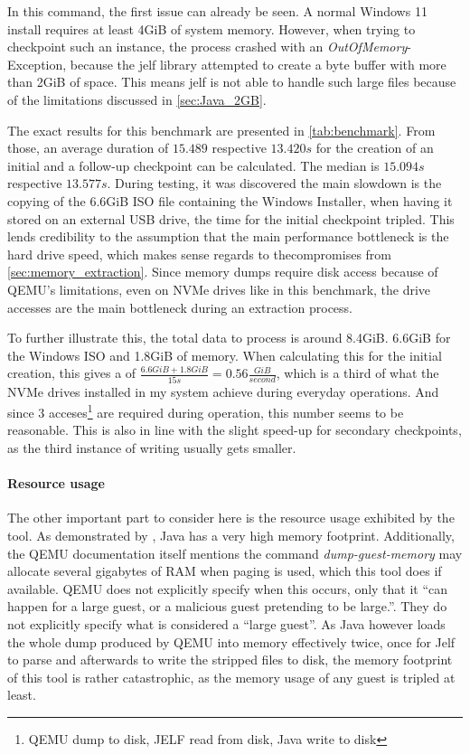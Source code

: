In this command, the first issue can already be seen.
A normal Windows 11 install requires at least 4GiB of system memory.
However, when trying to checkpoint such an instance, the process crashed with an \emph{OutOfMemory}-Exception,
because the jelf library\cite{jelf} attempted to create a byte buffer with more than 2GiB of space.
This means jelf is not able to handle such large files because of the limitations discussed in \autoref{sec:Java_2GB}.

The exact results for this benchmark are presented in \autoref{tab:benchmark}.
From those, an average duration of $15.489$ respective $13.420s$ for the creation of an initial and a follow-up checkpoint can be calculated.
The median is $15.094s$ respective $13.577s$.
During testing, it was discovered the main slowdown is the copying of the 6.6GiB ISO file containing the Windows Installer,
when having it stored on an external USB drive, the time for the initial checkpoint tripled.
This lends credibility to the assumption that the main performance bottleneck is the hard drive speed,
which makes sense regards to thecompromises from \autoref{sec:memory_extraction}.
Since memory dumps require disk access because of QEMU's limitations,
even on NVMe drives like in this benchmark, the drive accesses are the main bottleneck during an extraction process.

To further illustrate this, the total data to process is around 8.4GiB. 6.6GiB for the Windows ISO and 1.8GiB of memory.
When calculating this for the initial creation, this gives a  of $\frac{6.6GiB + 1.8 GiB}{15s}=0.56\frac{GiB}{second}$,
which is a third of what the NVMe drives installed in my system achieve during everyday operations.
And since 3 acceses\footnote{QEMU dump to disk, JELF read from disk, Java write to disk} are required during operation,
this number seems to be reasonable.
This is also in line with the slight speed-up for secondary checkpoints, as the third instance of writing usually gets smaller.

\paragraph{Resource usage} The other important part to consider here is the resource usage exhibited by the tool.
As demonstrated by ,
Java has a very high memory footprint\cite{Java_Performance}.
Additionally, the QEMU documentation itself mentions the command \emph{dump-guest-memory}
may allocate several gigabytes of RAM when paging is used,
which this tool does if available.
QEMU does not explicitly specify when this occurs,
only that it \enquote{can happen for a large guest, or a malicious guest pretending to be large.}\cite{qmp-commands}.
They do not explicitly specify what is considered a \enquote{large guest}.
As Java however loads the whole dump produced by QEMU into memory effectively twice,
once for Jelf to parse and afterwards to write the stripped files to disk,
the memory footprint of this tool is rather catastrophic,
as the memory usage of any guest is tripled at least.

